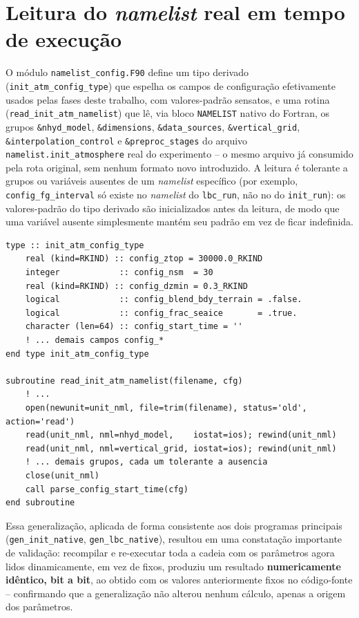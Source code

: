 \section{Leitura do \textit{namelist} real em tempo de execução}
\label{sec:namelist_config}

O módulo \texttt{namelist\_config.F90} define um tipo derivado
(\texttt{init\_atm\_config\_type}) que espelha os campos de configuração
efetivamente usados pelas fases deste trabalho, com valores-padrão
sensatos, e uma rotina (\texttt{read\_init\_atm\_namelist}) que lê, via
bloco \texttt{NAMELIST} nativo do Fortran, os grupos
\texttt{\&nhyd\_model}, \texttt{\&dimensions}, \texttt{\&data\_sources},
\texttt{\&vertical\_grid}, \texttt{\&interpolation\_control} e
\texttt{\&preproc\_stages} do arquivo \texttt{namelist.init\_atmosphere}
real do experimento -- o mesmo arquivo já consumido pela rota original,
sem nenhum formato novo introduzido. A leitura é tolerante a grupos ou
variáveis ausentes de um \textit{namelist} específico (por exemplo,
\texttt{config\_fg\_interval} só existe no \textit{namelist} do
\texttt{lbc\_run}, não no do \texttt{init\_run}): os valores-padrão do
tipo derivado são inicializados antes da leitura, de modo que uma
variável ausente simplesmente mantém seu padrão em vez de ficar
indefinida.

\begin{lstlisting}[caption={Trecho ilustrativo de \texttt{namelist\_config.F90}: leitura tolerante de múltiplos grupos de \textit{namelist}.}, label={lst:namelist}]
type :: init_atm_config_type
    real (kind=RKIND) :: config_ztop = 30000.0_RKIND
    integer            :: config_nsm  = 30
    real (kind=RKIND) :: config_dzmin = 0.3_RKIND
    logical            :: config_blend_bdy_terrain = .false.
    logical            :: config_frac_seaice       = .true.
    character (len=64) :: config_start_time = ''
    ! ... demais campos config_*
end type init_atm_config_type

subroutine read_init_atm_namelist(filename, cfg)
    ! ...
    open(newunit=unit_nml, file=trim(filename), status='old', action='read')
    read(unit_nml, nml=nhyd_model,    iostat=ios); rewind(unit_nml)
    read(unit_nml, nml=vertical_grid, iostat=ios); rewind(unit_nml)
    ! ... demais grupos, cada um tolerante a ausencia
    close(unit_nml)
    call parse_config_start_time(cfg)
end subroutine
\end{lstlisting}

Essa generalização, aplicada de forma consistente aos dois programas
principais (\texttt{gen\_init\_native}, \texttt{gen\_lbc\_native}),
resultou em uma constatação importante de validação: recompilar e
re-executar toda a cadeia com os parâmetros agora lidos dinamicamente,
em vez de fixos, produziu um resultado \textbf{numericamente idêntico,
bit a bit}, ao obtido com os valores anteriormente fixos no
código-fonte -- confirmando que a generalização não alterou nenhum
cálculo, apenas a origem dos parâmetros.

